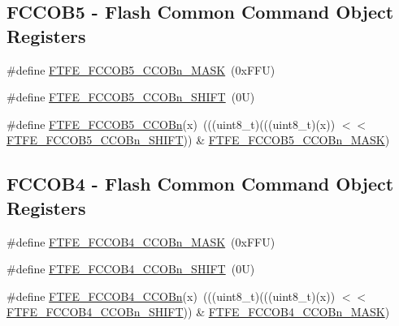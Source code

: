 \subsection*{F\+C\+C\+O\+B5 -\/ Flash Common Command Object Registers}
\begin{DoxyCompactItemize}
\item 
\#define \mbox{\hyperlink{group___f_t_f_e___register___masks_ga1fed27b766792ecc82407cbddb36d6f8}{F\+T\+F\+E\+\_\+\+F\+C\+C\+O\+B5\+\_\+\+C\+C\+O\+Bn\+\_\+\+M\+A\+SK}}~(0x\+F\+F\+U)
\item 
\#define \mbox{\hyperlink{group___f_t_f_e___register___masks_gaec76e9576208928867d1f819be0a8c66}{F\+T\+F\+E\+\_\+\+F\+C\+C\+O\+B5\+\_\+\+C\+C\+O\+Bn\+\_\+\+S\+H\+I\+FT}}~(0\+U)
\item 
\#define \mbox{\hyperlink{group___f_t_f_e___register___masks_ga3e61570eff41ab6f16727520d6de2750}{F\+T\+F\+E\+\_\+\+F\+C\+C\+O\+B5\+\_\+\+C\+C\+O\+Bn}}(x)~(((uint8\+\_\+t)(((uint8\+\_\+t)(x)) $<$$<$ \mbox{\hyperlink{group___f_t_f_e___register___masks_gaec76e9576208928867d1f819be0a8c66}{F\+T\+F\+E\+\_\+\+F\+C\+C\+O\+B5\+\_\+\+C\+C\+O\+Bn\+\_\+\+S\+H\+I\+FT}})) \& \mbox{\hyperlink{group___f_t_f_e___register___masks_ga1fed27b766792ecc82407cbddb36d6f8}{F\+T\+F\+E\+\_\+\+F\+C\+C\+O\+B5\+\_\+\+C\+C\+O\+Bn\+\_\+\+M\+A\+SK}})
\end{DoxyCompactItemize}
\subsection*{F\+C\+C\+O\+B4 -\/ Flash Common Command Object Registers}
\begin{DoxyCompactItemize}
\item 
\#define \mbox{\hyperlink{group___f_t_f_e___register___masks_gad17f10cdfff46d245fa4c9511a45e205}{F\+T\+F\+E\+\_\+\+F\+C\+C\+O\+B4\+\_\+\+C\+C\+O\+Bn\+\_\+\+M\+A\+SK}}~(0x\+F\+F\+U)
\item 
\#define \mbox{\hyperlink{group___f_t_f_e___register___masks_ga83b627db8362dc2297b26ecbf2cae0a6}{F\+T\+F\+E\+\_\+\+F\+C\+C\+O\+B4\+\_\+\+C\+C\+O\+Bn\+\_\+\+S\+H\+I\+FT}}~(0\+U)
\item 
\#define \mbox{\hyperlink{group___f_t_f_e___register___masks_gabce401f12c6def3ea6a54f3b879e51ed}{F\+T\+F\+E\+\_\+\+F\+C\+C\+O\+B4\+\_\+\+C\+C\+O\+Bn}}(x)~(((uint8\+\_\+t)(((uint8\+\_\+t)(x)) $<$$<$ \mbox{\hyperlink{group___f_t_f_e___register___masks_ga83b627db8362dc2297b26ecbf2cae0a6}{F\+T\+F\+E\+\_\+\+F\+C\+C\+O\+B4\+\_\+\+C\+C\+O\+Bn\+\_\+\+S\+H\+I\+FT}})) \& \mbox{\hyperlink{group___f_t_f_e___register___masks_gad17f10cdfff46d245fa4c9511a45e205}{F\+T\+F\+E\+\_\+\+F\+C\+C\+O\+B4\+\_\+\+C\+C\+O\+Bn\+\_\+\+M\+A\+SK}})
\end{DoxyCompactItemize}
